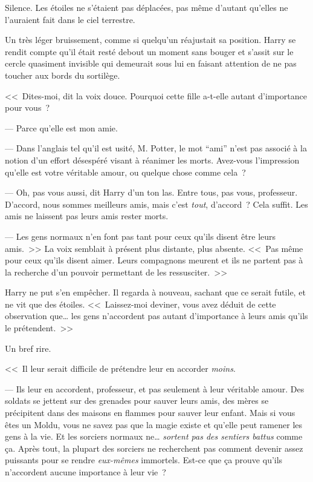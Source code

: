 Silence. Les étoiles ne s'étaient pas déplacées, pas même d'autant qu'elles ne l'auraient fait dans le ciel terrestre.

Un très léger bruissement, comme si quelqu'un réajustait sa position. Harry se rendit compte qu'il était resté debout un moment sans bouger et s'assit sur le cercle quasiment invisible qui demeurait sous lui en faisant attention de ne pas toucher aux bords du sortilège.

<<~Dites-moi, dit la voix douce. Pourquoi cette fille a-t-elle autant d'importance pour vous~?

--- Parce qu'elle est mon amie.

--- Dans l'anglais tel qu'il est usité, M. Potter, le mot “ami” n'est pas associé à la notion d'un effort désespéré visant à réanimer les morts. Avez-vous l'impression qu'elle est votre véritable amour, ou quelque chose comme cela~?

--- Oh, pas vous aussi, dit Harry d'un ton las. Entre tous, pas vous, professeur. D'accord, nous sommes meilleurs amis, mais c'est \emph{tout}, d'accord~? Cela suffit. Les amis ne laissent pas leurs amis rester morts.

--- Les gens normaux n'en font pas tant pour ceux qu'ils disent être leurs amis.~>> La voix semblait à présent plus distante, plus absente. <<~Pas même pour ceux qu'ils disent aimer. Leurs compagnons meurent et ils ne partent pas à la recherche d'un pouvoir permettant de les ressusciter.~>>

Harry ne put s'en empêcher. Il regarda à nouveau, sachant que ce serait futile, et ne vit que des étoiles. <<~Laissez-moi deviner, vous avez déduit de cette observation que… les gens n'accordent pas autant d'importance à leurs amis qu'ils le prétendent.~>>

Un bref rire.

<<~Il leur serait difficile de prétendre leur en accorder \emph{moins}.

--- Ils leur en accordent, professeur, et pas seulement à leur véritable amour. Des soldats se jettent sur des grenades pour sauver leurs amis, des mères se précipitent dans des maisons en flammes pour sauver leur enfant. Mais si vous êtes un Moldu, vous ne savez pas que la magie existe et qu'elle peut ramener les gens à la vie. Et les sorciers normaux ne… \emph{sortent pas des sentiers battus} comme ça. Après tout, la plupart des sorciers ne recherchent pas comment devenir assez puissants pour se rendre \emph{eux-mêmes} immortels. Est-ce que ça prouve qu'ils n'accordent aucune importance à leur vie~?

